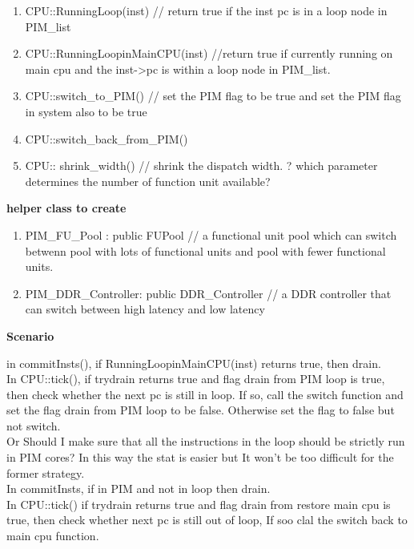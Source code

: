 \documentclass[11pt]{article}
\begin{document}
\begin{enumerate}
	\item CPU::RunningLoop(inst) // return true if the inst pc is in a loop node in PIM\_list

	\item CPU::RunningLoopinMainCPU(inst) //return true if currently running on main cpu and the inst-\textgreater pc is within a loop node in PIM\_list.
	
	\item CPU::switch\_to\_PIM() // set the PIM flag to be true and set the PIM flag in system also to be true
	
	\item CPU::switch\_back\_from\_PIM()
	
	\item CPU:: shrink\_width() // shrink the dispatch width. ? which parameter determines the number of function unit available?
\end{enumerate}

\textbf{helper class to create}

\begin{enumerate}
	\item PIM\_FU\_Pool : public FUPool // a functional unit pool which can switch betwenn pool with lots of functional units and pool with fewer functional units.
	
	\item PIM\_DDR\_Controller: public DDR\_Controller // a DDR controller that can switch between high latency and low latency
\end{enumerate}

\textbf{Scenario\\}

in commitInsts(), if RunningLoopinMainCPU(inst) returns true, then drain.\\

In CPU::tick(), if trydrain returns true and flag drain from PIM loop is true, then check whether the next pc is still in loop. If so, call the switch function and set the flag drain from PIM loop to be false. Otherwise set the flag to false but not switch.\\

Or Should I make sure that all the instructions in the loop should be strictly run in PIM cores? In this way the stat is easier but It won't be too difficult for the former strategy.\\

In commitInsts, if in PIM and not in loop then drain.\\ 

In CPU::tick() if trydrain returns true and flag drain from restore main cpu is true, then check whether next pc is still out of loop, If soo clal the switch back to main cpu function.
\end{document}
